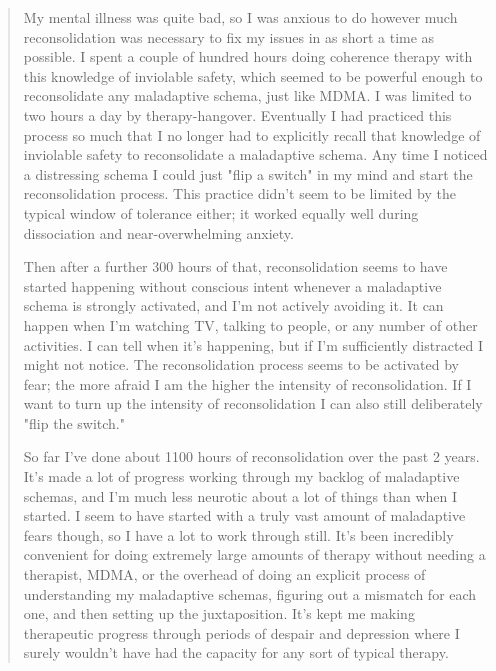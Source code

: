 \documentclass[12pt,letterpaper]{book}
\begin{document}
\begin{quotation}
    My mental illness was quite bad, so I was anxious to do however much reconsolidation was necessary to fix my issues in as short a time as possible. I spent a couple of hundred hours doing coherence therapy with this knowledge of inviolable safety, which seemed to be powerful enough to reconsolidate any maladaptive schema, just like MDMA. I was limited to two hours a day by therapy-hangover. Eventually I had practiced this process so much that I no longer had to explicitly recall that knowledge of inviolable safety to reconsolidate a maladaptive schema. Any time I noticed a distressing schema I could just "flip a switch" in my mind and start the reconsolidation process. This practice didn't seem to be limited by the typical window of tolerance either; it worked equally well during dissociation and near-overwhelming anxiety.

    Then after a further 300 hours of that, reconsolidation seems to have started happening without conscious intent whenever a maladaptive schema is strongly activated, and I'm not actively avoiding it. It can happen when I'm watching TV, talking to people, or any number of other activities. I can tell when it's happening, but if I'm sufficiently distracted I might not notice. The reconsolidation process seems to be activated by fear; the more afraid I am the higher the intensity of reconsolidation. If I want to turn up the intensity of reconsolidation I can also still deliberately "flip the switch."

    So far I've done about 1100 hours of reconsolidation over the past 2 years. It's made a lot of progress working through my backlog of maladaptive schemas, and I'm much less neurotic about a lot of things than when I started. I seem to have started with a truly vast amount of maladaptive fears though, so I have a lot to work through still. It's been incredibly convenient for doing extremely large amounts of therapy without needing a therapist, MDMA, or the overhead of doing an explicit process of understanding my maladaptive schemas, figuring out a mismatch for each one, and then setting up the juxtaposition. It's kept me making therapeutic progress through periods of despair and depression where I surely wouldn't have had the capacity for any sort of typical therapy.


\end{quotation}
\end{document}
